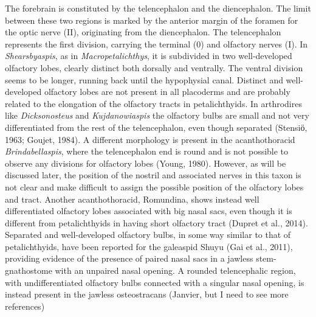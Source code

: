 \documentclass[12pt,letterpaper]{article}
\begin{document}
The forebrain is constituted by the telencephalon and the diencephalon. The limit between these two regions is marked by the anterior margin of the foramen for the optic nerve (II), originating from the diencephalon. The telencephalon represents the first division, carrying the terminal (0) and olfactory nerves (I). In \textit{Shearsbyaspis}, as in \textit{Macropetalichthys}, it is subdivided in two well-developed olfactory lobes, clearly distinct both dorsally and ventrally. The ventral division seems to be longer, running back until the hypophysial canal. Distinct and well-developed olfactory lobes are not present in all placoderms and are probably related to the elongation of the olfactory tracts in petalichthyids. In arthrodires like \textit{Dicksonosteus} and \textit{Kujdanowiaspis} the olfactory bulbs are small and not very differentiated from the rest of the telencephalon, even though separated (Stensiӧ, 1963; Goujet, 1984). A different morphology is present in the acanthothoracid \textit{Brindabellaspis}, where the telencephalon end is round and is not possible to observe any divisions for olfactory lobes (Young, 1980). However, as will be discussed later, the position of the nostril and associated nerves in this taxon is not clear and make difficult to assign the possible position of the olfactory lobes and tract. Another acanthothoracid, Romundina, shows instead well differentiated olfactory lobes associated with big nasal sacs, even though it is different from petalichthyids in having short olfactory tract (Dupret et al., 2014). Separated and well-developed olfactory bulbs, in some way similar to that of petalichthyids, have been reported for the galeaspid Shuyu (Gai et al., 2011), providing evidence of the presence of paired nasal sacs in a jawless stem-gnathostome with an unpaired nasal opening. A rounded telencephalic region, with undifferentiated olfactory bulbs connected with a singular nasal opening, is instead present in the jawless osteostracans (Janvier, but I need to see more references)
\end{document}
